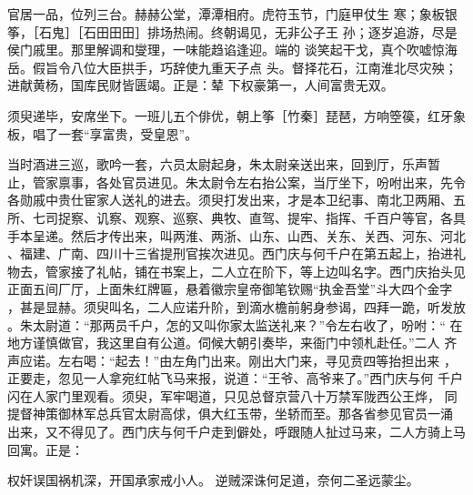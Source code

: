 官居一品，位列三台。赫赫公堂，潭潭相府。虎符玉节，门庭甲仗生
寒；象板银筝，［石鬼］［石田田田］排场热闹。终朝谒见，无非公子王
孙；逐岁追游，尽是侯门戚里。那里解调和燮理，一味能趋谄逢迎。端的
谈笑起干戈，真个吹嘘惊海岳。假旨令八位大臣拱手，巧辞使九重天子点
头。督择花石，江南淮北尽灾殃；进献黄杨，国库民财皆匮竭。正是：辇
下权豪第一，人间富贵无双。

须臾递毕，安席坐下。一班儿五个俳优，朝上筝［竹秦］琵琶，方响箜篌，红牙象
板，唱了一套“享富贵，受皇恩”。

当时酒进三巡，歌吟一套，六员太尉起身，朱太尉亲送出来，回到厅，乐声暂
止，管家禀事，各处官员进见。朱太尉令左右抬公案，当厅坐下，吩咐出来，先令
各勋戚中贵仕宦家人送礼的进去。须臾打发出来，才是本卫纪事、南北卫两厢、五
所、七司捉察、讥察、观察、巡察、典牧、直驾、提牢、指挥、千百户等官，各具
手本呈递。然后才传出来，叫两淮、两浙、山东、山西、关东、关西、河东、河北
、福建、广南、四川十三省提刑官挨次进见。西门庆与何千户在第五起上，抬进礼
物去，管家接了礼帖，铺在书案上，二人立在阶下，等上边叫名字。西门庆抬头见
正面五间厂厅，上面朱红牌匾，悬着徽宗皇帝御笔钦赐“执金吾堂”斗大四个金字
，甚是显赫。须臾叫名，二人应诺升阶，到滴水檐前躬身参谒，四拜一跪，听发放
。朱太尉道：“那两员千户，怎的又叫你家太监送礼来？”令左右收了，吩咐：“
在地方谨慎做官，我这里自有公道。伺候大朝引奏毕，来衙门中领札赴任。”二人
齐声应诺。左右喝：“起去！”由左角门出来。刚出大门来，寻见贲四等抬担出来
，正要走，忽见一人拿宛红帖飞马来报，说道：“王爷、高爷来了。”西门庆与何
千户闪在人家门里观看。须臾，军牢喝道，只见总督京营八十万禁军陇西公王烨，
同提督神策御林军总兵官太尉高俅，俱大红玉带，坐轿而至。那各省参见官员一涌
出来，又不得见了。西门庆与何千户走到僻处，呼跟随人扯过马来，二人方骑上马
回寓。正是：

权奸误国祸机深，开国承家戒小人。
逆贼深诛何足道，奈何二圣远蒙尘。